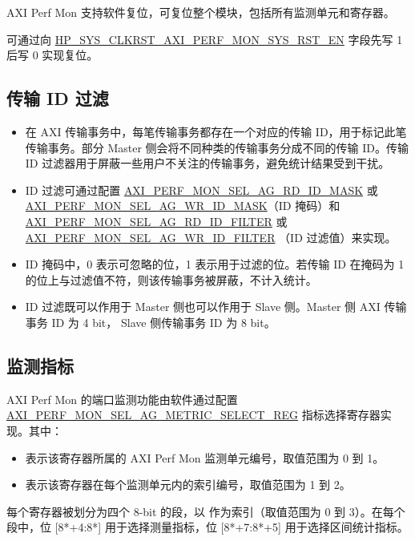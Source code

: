 \documentclass[main\_\_CN.tex]{subfiles}
\begin{document}
AXI Perf Mon 支持软件复位，可复位整个模块，包括所有监测单元和寄存器。

可通过向 \hyperref[fielddesc:HPSYSCLKRSTAXIPERFMONSYSRSTEN]{HP\_SYS\_CLKRST\_AXI\_PERF\_MON\_SYS\_RST\_EN} 字段先写 1 后写 0 实现复位。

\subsection{传输 ID 过滤}
\begin{itemize}
    \item 在 AXI 传输事务中，每笔传输事务都存在一个对应的传输 ID，用于标记此笔传输事务。部分 Master 侧会将不同种类的传输事务分成不同的传输 ID。传输 ID 过滤器用于屏蔽一些用户不关注的传输事务，避免统计结果受到干扰。
    \item ID 过滤可通过配置 \hyperref[fielddesc:AXIPERFMONSELAGNRDIDMASK]{AXI\_PERF\_MON\_SEL\_AG\_RD\_ID\_MASK} 或 \hyperref[fielddesc:AXIPERFMONSELAGNWRIDMASK]{AXI\_PERF\_MON\_SEL\_AG\_WR\_ID\_MASK}（ID 掩码）和 \hyperref[fielddesc:AXIPERFMONSELAGNRDIDFILTER]{AXI\_PERF\_MON\_SEL\_AG\_RD\_ID\_FILTER} 或 \hyperref[fielddesc:AXIPERFMONSELAGNWRIDFILTER]{AXI\_PERF\_MON\_SEL\_AG\_WR\_ID\_FILTER} （ID 过滤值）来实现。
    \item ID 掩码中，0 表示可忽略的位，1 表示用于过滤的位。若传输 ID 在掩码为 1 的位上与过滤值不符，则该传输事务被屏蔽，不计入统计。
    \item ID 过滤既可以作用于 Master 侧也可以作用于 Slave 侧。Master 侧 AXI 传输事务 ID 为 4 bit， Slave 侧传输事务 ID 为 8 bit。
\end{itemize}

\subsection{监测指标}

AXI Perf Mon 的端口监测功能由软件通过配置 \hyperref[regdesc:AXIPERFMONSELAGNMETRICSELECTMREG]{AXI\_PERF\_MON\_SEL\_AG\_METRIC\_SELECT\_REG} 指标选择寄存器实现。其中：
\begin{itemize}
    \item {} 表示该寄存器所属的 AXI Perf Mon 监测单元编号，取值范围为 0 到 1。
    \item {} 表示该寄存器在每个监测单元内的索引编号，取值范围为 1 到 2。
\end{itemize}

每个寄存器被划分为四个 8-bit 的段，以  作为索引（取值范围为 0 到 3）。在每个段中，位 [8*+4:8*] 用于选择测量指标，位 [8*+7:8*+5] 用于选择区间统计指标。
\end{document}
